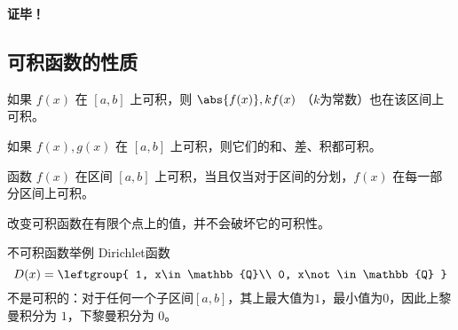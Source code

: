 \textbf{证毕！}

\subsection{可积函数的性质}

\begin{theorem}{}\label{the_InFun_2}
如果 $f(x)$ 在 $[a,b]$ 上可积，则 $\abs{f(x)},kf(x)$ （$k$为常数）也在该区间上可积。
\end{theorem}
\begin{theorem}{}
如果 $f(x),g(x)$ 在 $[a,b]$ 上可积，则它们的和、差、积都可积。
\end{theorem}

\begin{theorem}{}\label{the_InFun_1}
函数 $f(x)$ 在区间 $[a,b]$ 上可积，当且仅当对于区间的分划，$f(x)$ 在每一部分区间上可积。
\end{theorem}

\begin{theorem}{}
改变可积函数在有限个点上的值，并不会破坏它的可积性。
\end{theorem}

\begin{example}{不可积函数举例}
Dirichlet函数
\begin{equation}
D(x)=
\leftgroup{
    1, x\in\mathbb{Q}\\
    0, x\not\in\mathbb{Q}
}
\end{equation}
不是可积的：对于任何一个子区间$[a, b]$，其上最大值为$1$，最小值为$0$，因此上黎曼积分为 $1$，下黎曼积分为 $0$。
\end{example}